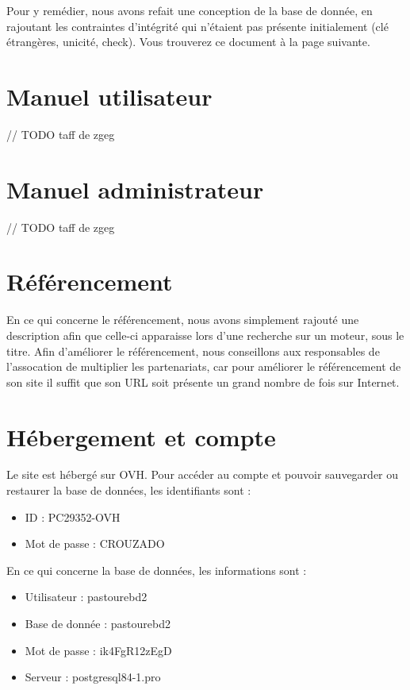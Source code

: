\documentclass[11pt]{report}
\begin{document}
\par Pour y remédier, nous avons refait une conception de la base de donnée, en
rajoutant les contraintes d'intégrité qui n'étaient pas présente initialement
(clé étrangères, unicité, check). Vous trouverez ce document à la page suivante.


\section{Manuel utilisateur}
// TODO taff de zgeg
\section{Manuel administrateur}
// TODO taff de zgeg
\section{Référencement}
En ce qui concerne le référencement, nous avons simplement rajouté une
description afin que celle-ci apparaisse lors d'une recherche sur un moteur,
sous le titre. Afin d'améliorer le référencement, nous conseillons aux
responsables de l'assocation de multiplier les partenariats, car pour améliorer
le référencement de son site il suffit que son URL soit présente un grand nombre
de fois sur Internet.

\section{Hébergement et compte}
Le site est hébergé sur OVH. Pour accéder au compte et pouvoir sauvegarder ou
restaurer la base de données, les identifiants sont : \\
\begin{itemize}
  \item ID : PC29352-OVH
  \item Mot de passe : CROUZADO \\
\end{itemize}

\par En ce qui concerne la base de données, les informations sont : \\
\begin{itemize}
  \item Utilisateur : pastourebd2
  \item Base de donnée : pastourebd2
  \item Mot de passe :  ik4FgR12zEgD
  \item Serveur : postgresql84-1.pro \\
\end{itemize}
\end{document}

